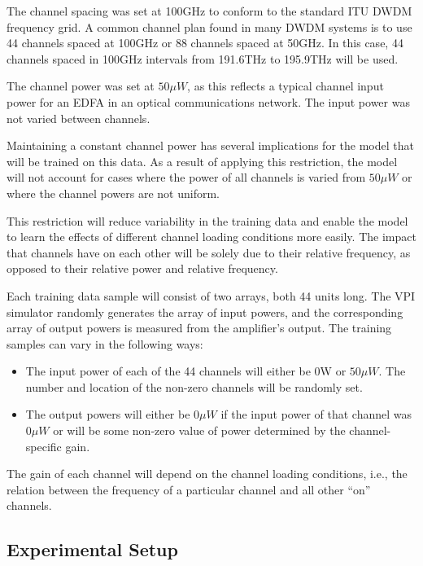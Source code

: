 The channel spacing was set at 100GHz to conform to the standard ITU DWDM frequency grid. A common channel plan found in many DWDM systems is to use 44 channels spaced at 100GHz or 88 channels spaced at 50GHz. In this case, 44 channels spaced in 100GHz intervals from 191.6THz to 195.9THz will be used.  

The channel power was set at $50\mu W$, as this reflects a typical channel input power for an EDFA in an optical communications network. The input power was not varied between channels.

Maintaining a constant channel power has several implications for the model that will be trained on this data. As a result of applying this restriction, the model will not account for cases where the power of all channels is varied from $50\mu W$ or where the channel powers are not uniform. 

This restriction will reduce variability in the training data and enable the model to learn the effects of different channel loading conditions more easily. The impact that channels have on each other will be solely due to their relative frequency, as opposed to their relative power and relative frequency.


Each training data sample will consist of two arrays, both 44 units long. The VPI simulator randomly generates the array of input powers, and the corresponding array of output powers is measured from the amplifier’s output. The training samples can vary in the following ways:
\begin{itemize}
    \item The input power of each of the 44 channels will either be 0W or $50\mu W$. The number and location of the non-zero channels will be randomly set.
    
    \item The output powers will either be $0\mu W$ if the input power of that channel was $0\mu W$ or will be some non-zero value of power determined by the channel-specific gain.
\end{itemize}

The gain of each channel will depend on the channel loading conditions, i.e., the relation between the frequency of a particular channel and all other “on” channels.



\subsection{Experimental Setup}
\FloatBarrier

